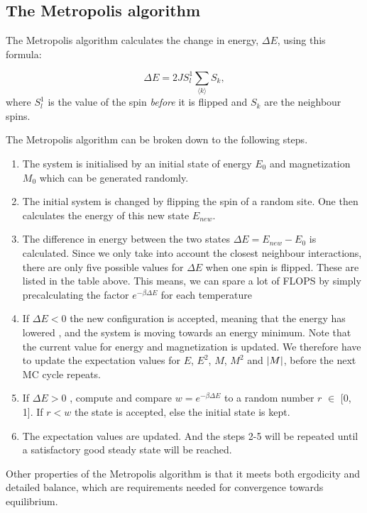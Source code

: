 \documentclass{article}
\begin{document}
\subsection{The Metropolis algorithm}\label{const_mot}

The Metropolis algorithm calculates the change in energy, $\Delta E$, using this formula:

\begin{equation}
\Delta E = 2JS^1_l\sum_{\langle k \rangle}S_k,
\end{equation}
where $S^1_l$ is the value of the spin \textit{before} it is flipped and $S_k$ are the neighbour spins. 






The Metropolis algorithm can be broken down to the following steps.
\begin{enumerate}
\item The system is initialised by an initial state of energy $E_0$ and magnetization $M_0$ which can be  generated randomly. 
\item The initial system is changed by flipping the spin of a random site. One then calculates the energy of this new state $E_{new}$.
\item The difference in energy between the two states $\Delta E =  E_{new} -E_0$ is calculated. Since we only take into account the closest neighbour interactions, there are only five  possible values for $\Delta E$ when one spin is flipped. These are listed in the table above. This means, we can spare a lot of FLOPS by simply precalculating the factor  $e^{-\beta\Delta E}$  for each temperature  
\item If $ \Delta E < 0$ the new configuration is accepted, meaning that the energy has  lowered , and the system is moving towards an energy minimum. Note that the current value  for energy and magnetization is updated. We therefore have to update the expectation values for $E$, $E^2$, $M$, $M^2$ and $\abs{M}$, before the next MC cycle repeats.
\item If $ \Delta E > 0$ , compute and compare  $w =   e^{-\beta\Delta E}$  to a random number $r$ $\in$ [0, 1]. If $r < w$ the state is accepted, else the initial state is kept.
\item The expectation values are updated. And the steps 2-5 will be repeated until a satisfactory good steady state will be reached.

\end{enumerate}
Other properties of the Metropolis algorithm is that it meets both ergodicity and detailed balance, which are requirements needed for convergence towards equilibrium.
\end{document}
